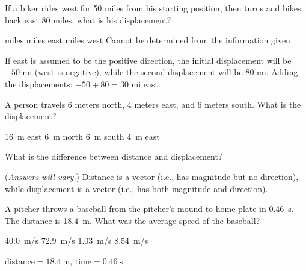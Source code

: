 \documentclass[answers]{exam}
\begin{document}
\begin{questions}
\begin{questions}


\question
If a biker rides west for 50 miles from his starting position, then turns and bikes back east 80 miles, what is his displacement?

\begin{choices}
 miles
 miles east
 miles west
\choice Cannot be determined from the information given
\end{choices}

\begin{solution}
If east is assumed to be the positive direction, the initial displacement will be $-50$ mi (west is negative), while the second displacement will be 80 mi. Adding the displacements: $-50 + 80 = 30$ mi east.
\end{solution}

\question
A person travels 6 meters north, 4 meters east, and 6 meters south. What is the displacement?

\begin{choices}
\choice \SI{16}{\meter} east
\choice \SI{6}{\meter} north
\choice \SI{6}{\meter} south
\CorrectChoice \SI{4}{\meter} east
\end{choices}

\question %
What is the difference between distance and displacement?

\begin{solution}
(\textit{Answers will vary.}) Distance is a vector (i.e., has magnitude but no direction), while displacement is a vector (i.e., has both magnitude and direction).
\end{solution}

\clearpage


\question
A pitcher throws a baseball from the pitcher's mound to home plate in \SI{0.46}{s}. The distance is \SI{18.4}{m}. What was the average speed of the baseball?

\begin{choices}
\correctchoice \SI{40.0}{m/s}
\choice \SI{72.9}{m/s}
\choice \SI{1.03}{m/s}
\choice \SI{8.54}{m/s}
\end{choices}

\begin{solution}
    $\text{distance} = \SI{18.4}{\meter}$, $\text{time}=\SI{0.46}{\second}$


\end{solution}
\end{questions}
\end{questions}
\end{document}
